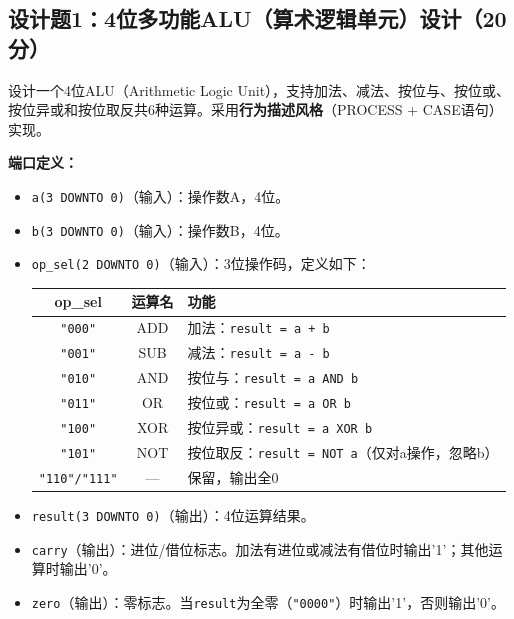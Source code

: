 \subsection*{设计题1：4位多功能ALU（算术逻辑单元）设计（20分）}

设计一个4位ALU（Arithmetic Logic Unit），支持加法、减法、按位与、按位或、按位异或和按位取反共6种运算。采用\textbf{行为描述风格}（PROCESS + CASE语句）实现。

\vspace{0.3cm}

\textbf{端口定义：}
\begin{itemize}
  \item \texttt{a(3 DOWNTO 0)}（输入）：操作数A，4位。
  \item \texttt{b(3 DOWNTO 0)}（输入）：操作数B，4位。
  \item \texttt{op\_sel(2 DOWNTO 0)}（输入）：3位操作码，定义如下：
  \begin{center}
  \begin{tabular}{|c|c|l|}
  \hline
  \textbf{op\_sel} & \textbf{运算名} & \textbf{功能} \\
  \hline
  \texttt{"000"} & ADD  & 加法：\texttt{result = a + b} \\
  \texttt{"001"} & SUB  & 减法：\texttt{result = a - b} \\
  \texttt{"010"} & AND  & 按位与：\texttt{result = a AND b} \\
  \texttt{"011"} & OR   & 按位或：\texttt{result = a OR b} \\
  \texttt{"100"} & XOR  & 按位异或：\texttt{result = a XOR b} \\
  \texttt{"101"} & NOT  & 按位取反：\texttt{result = NOT a}（仅对a操作，忽略b） \\
  \texttt{"110"/"111"} & — & 保留，输出全0 \\
  \hline
  \end{tabular}
  \end{center}
  \item \texttt{result(3 DOWNTO 0)}（输出）：4位运算结果。
  \item \texttt{carry}（输出）：进位/借位标志。加法有进位或减法有借位时输出'1'；其他运算时输出'0'。
  \item \texttt{zero}（输出）：零标志。当\texttt{result}为全零（\texttt{"0000"}）时输出'1'，否则输出'0'。
\end{itemize}

\vspace{0.3cm}

